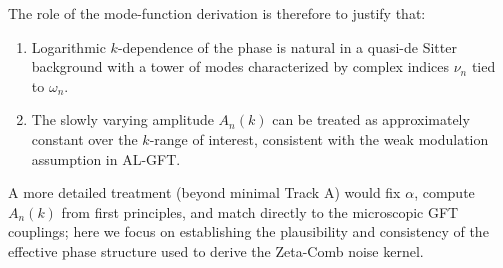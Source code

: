 \documentclass[12pt]{article}
\begin{document}
The role of the mode-function derivation is therefore to justify that:
\begin{enumerate}
  \item Logarithmic \(k\)-dependence of the phase is natural in a quasi-de Sitter
        background with a tower of modes characterized by complex indices
        \(\nu_n\) tied to \(\omega_n\).
  \item The slowly varying amplitude \(A_n(k)\) can be treated as approximately
        constant over the \(k\)-range of interest, consistent with the weak
        modulation assumption in AL-GFT.
\end{enumerate}
A more detailed treatment (beyond minimal Track A) would fix \(\alpha\),
compute \(A_n(k)\) from first principles, and match directly to the microscopic
GFT couplings; here we focus on establishing the plausibility and consistency
of the effective phase structure used to derive the Zeta-Comb noise kernel.
\end{document}
